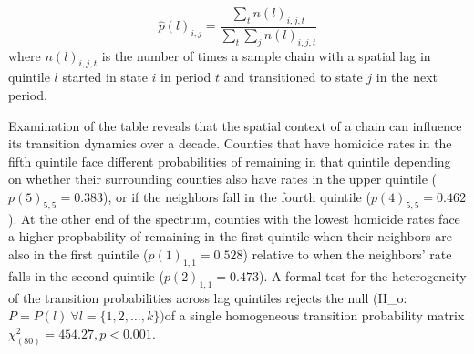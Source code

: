 \documentclass[11pt, titlepage]{article}
\begin{document}
\begin{equation}
\hat{p}(l)_{i,j} = \frac{\sum_t n(l)_{i,j,t}}{\sum_t \sum_j n(l)_{i,j,t}} 
\label{e:cm}
\end{equation}
where $n(l)_{i,j,t}$ is the number of times a sample chain with a
spatial lag in quintile $l$ started in state $i$
in period $t$ and transitioned to state $j$ in the next period.

Examination of the table reveals that the spatial context of a chain can
influence its transition dynamics over a decade. Counties that have
homicide rates in the fifth quintile face different probabilities of
remaining in that quintile depending on whether their surrounding
counties also have rates in the upper quintile ($p(5)_{5,5} = 0.383$),
or if the neighbors fall in the fourth quintile ($p(4)_{5,5}=0.462$). At
the other end of the spectrum, counties with the lowest homicide rates
face a higher propbability of remaining in the first quintile when their
neighbors are also in the first quintile ($p(1)_{1,1}=0.528$) relative
to when the neighbors' rate falls in the second quintile
($p(2)_{1,1}=0.473$). A formal test for the heterogeneity of the
transition probabilities across lag quintiles rejects the null (H\_o:
$P=P(l) \ \forall l=\{1,2,\ldots,k\})$of a single homogeneous transition
probability matrix $\chi_{(80)}^2=454.27, p<0.001$.
\end{document}
